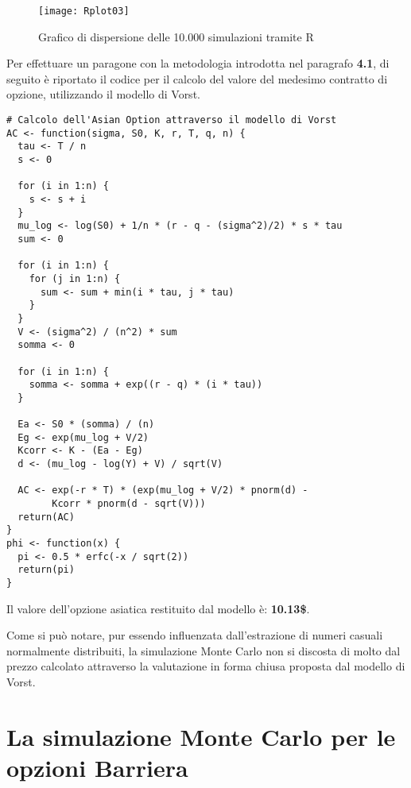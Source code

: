 \documentclass[12pt,a4paper]{report}
\begin{document}
\begin{figure}
     [ht]
    \centering
    \texttt{[image: Rplot03]}
    \caption{Grafico di dispersione delle 10.000 simulazioni tramite R}
    \label{fig:enter-label11}
\end{figure}


Per effettuare un paragone con la metodologia introdotta nel paragrafo \textbf{4.1}, di seguito è riportato il codice per il calcolo del valore del medesimo contratto di opzione, utilizzando il modello di Vorst.


\begin{verbatim}
# Calcolo dell'Asian Option attraverso il modello di Vorst
AC <- function(sigma, S0, K, r, T, q, n) {
  tau <- T / n
  s <- 0
  
  for (i in 1:n) {
    s <- s + i
  } 
  mu_log <- log(S0) + 1/n * (r - q - (sigma^2)/2) * s * tau
  sum <- 0
  
  for (i in 1:n) {
    for (j in 1:n) {
      sum <- sum + min(i * tau, j * tau)
    }
  } 
  V <- (sigma^2) / (n^2) * sum
  somma <- 0
  
  for (i in 1:n) {
    somma <- somma + exp((r - q) * (i * tau))
  }
  
  Ea <- S0 * (somma) / (n)
  Eg <- exp(mu_log + V/2)
  Kcorr <- K - (Ea - Eg)
  d <- (mu_log - log(Y) + V) / sqrt(V)
  
  AC <- exp(-r * T) * (exp(mu_log + V/2) * pnorm(d) -
        Kcorr * pnorm(d - sqrt(V)))
  return(AC)
}
phi <- function(x) {
  pi <- 0.5 * erfc(-x / sqrt(2))
  return(pi)
}
\end{verbatim}


Il valore dell'opzione asiatica restituito dal modello è: \textbf{10.13\$}.

Come si può notare, pur essendo influenzata dall'estrazione di numeri casuali normalmente distribuiti, la simulazione Monte Carlo non si discosta di molto dal prezzo calcolato attraverso la valutazione in forma chiusa proposta dal modello di Vorst.

\section{La simulazione Monte Carlo per le opzioni Barriera}
\end{document}
